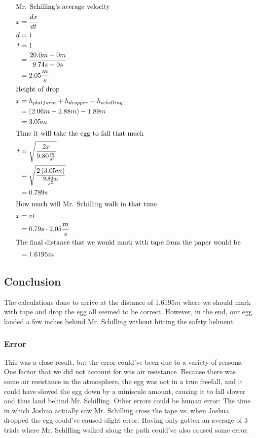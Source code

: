 \documentclass[12pt]{article}
\begin{document}
\begin{align*}
	\intertext{Mr. Schilling's average velocity}
	x & =\frac{dx}{dt}                                          \\
	d & =1                                                      \\
	t & =1                                                      \\
	  & =\frac{20.0m-0m}{9.74s-0s}                              \\
	  & =2.05\frac{m}{s}                                        \\
	\intertext{Height of drop}
	x & =h_{platform}+h_{dropper}-h_{schilling}                 \\
	  & =\left(2.06m+2.88m\right)-1.89m                         \\
	  & =3.05m                                                  \\
	\intertext{Time it will take the egg to fall that much}
	t & =\sqrt{\frac{2x}{9.80\frac{m}{s^{2}}}}                  \\
	  & =\sqrt{\frac{2\left(3.05m\right)}{\frac{9.80m}{s^{2}}}} \\
	  & =0.789s                                                 \\
	\intertext{How much will Mr. Schilling walk in that time}
	x & =vt                                                     \\
	  & =0.79s\cdot2.05\frac{m}{s}                              \\
	\intertext{The final distance that we would mark with tape from the paper would be}
	  & =1.6195m                                                \\
\end{align*}
\subsection{Conclusion}

The calculations done to arrive at the distance of \(1.6195m\) where we should mark with tape and drop the egg all seemed to be correct. However, in the end, our egg landed a few inches behind Mr. Schilling without hitting the safety helment.

\subsubsection{Error}

This was a close result, but the error could've been due to a variety of reasons. One factor that we did not account for was air resistance. Because there was some air resistance in the atmosphere, the egg was not in a true freefall, and it could have slowed the egg down by a miniscule amount, causing it to fall slower and thus land behind Mr. Schilling. Other errors could be human error: The time in which Joshua actually saw Mr. Schilling cross the tape vs. when Joshua dropped the egg could've caused slight error. Having only gotten an average of 3 trials where Mr. Schilling walked along the path could've also caused some error.
\end{document}
